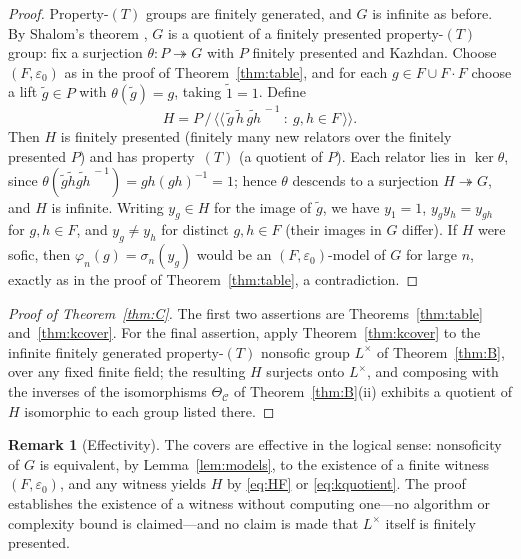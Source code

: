 \documentclass[11pt]{amsart}
\theoremstyle{definition}
\newtheorem{remark}[theorem]{Remark}
\theoremstyle{plain}
\newcommand{\eps}{\varepsilon}
\newcommand{\onto}{\twoheadrightarrow}
\begin{document}
\begin{proof}
Property-\((T)\) groups are finitely generated, and \(G\) is infinite as before.  By Shalom's theorem \cite{Shalom00}, \(G\) is a quotient of a finitely presented property-\((T)\) group: fix a surjection \(\theta:P\onto G\) with \(P\) finitely presented and Kazhdan.  Choose \((F,\eps_0)\) as in the proof of Theorem~\ref{thm:table}, and for each \(g\in F\cup F\!\cdot\!F\) choose a lift \(\tilde g\in P\) with \(\theta(\tilde g)=g\), taking \(\tilde 1=1\).  Define
\begin{equation}\label{eq:kquotient}
 H=P\,\big/\,\bigl\langle\!\bigl\langle\,
 \tilde g\,\tilde h\,\widetilde{gh}^{\,-1}
 \ :\ g,h\in F
 \,\bigr\rangle\!\bigr\rangle .
\end{equation}
Then \(H\) is finitely presented (finitely many new relators over the finitely presented \(P\)) and has property~\((T)\) (a quotient of \(P\)).  Each relator lies in \(\ker\theta\), since \(\theta(\tilde g\tilde h\widetilde{gh}^{\,-1})=gh(gh)^{-1}=1\); hence \(\theta\) descends to a surjection \(H\onto G\), and \(H\) is infinite.  Writing \(y_g\in H\) for the image of \(\tilde g\), we have \(y_1=1\), \(y_gy_h=y_{gh}\) for \(g,h\in F\), and \(y_g\ne y_h\) for distinct \(g,h\in F\) (their images in \(G\) differ).  If \(H\) were sofic, then \(\varphi_n(g)=\sigma_n(y_g)\) would be an \((F,\eps_0)\)-model of \(G\) for large \(n\), exactly as in the proof of Theorem~\ref{thm:table}, a contradiction.
\end{proof}

\begin{proof}[Proof of Theorem~\ref{thm:C}]
The first two assertions are Theorems~\ref{thm:table} and~\ref{thm:kcover}.  For the final assertion, apply Theorem~\ref{thm:kcover} to the infinite finitely generated property-\((T)\) nonsofic group \(L^\times\) of Theorem~\ref{thm:B}, over any fixed finite field; the resulting \(H\) surjects onto \(L^\times\), and composing with the inverses of the isomorphisms \(\Theta_{\mathcal C}\) of Theorem~\ref{thm:B}(ii) exhibits a quotient of \(H\) isomorphic to each group listed there.
\end{proof}

\begin{remark}[Effectivity]\label{rem:effective}
The covers are effective in the logical sense: nonsoficity of \(G\) is equivalent, by Lemma~\ref{lem:models}, to the existence of a finite witness \((F,\eps_0)\), and any witness yields \(H\) by \eqref{eq:HF} or \eqref{eq:kquotient}.  The proof establishes the existence of a witness without computing one---no algorithm or complexity bound is claimed---and no claim is made that \(L^\times\) itself is finitely presented.
\end{remark}
\end{document}
